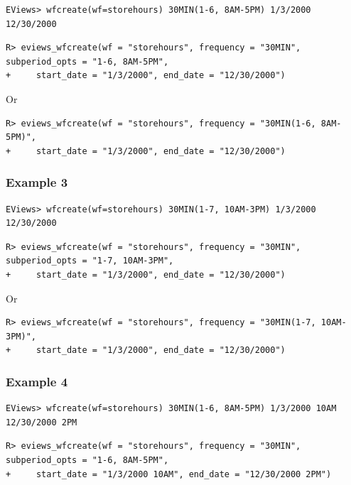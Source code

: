 \begin{verbatim}
EViews> wfcreate(wf=storehours) 30MIN(1-6, 8AM-5PM) 1/3/2000 12/30/2000
\end{verbatim}

\begin{verbatim}
R> eviews_wfcreate(wf = "storehours", frequency = "30MIN", subperiod_opts = "1-6, 8AM-5PM",
+     start_date = "1/3/2000", end_date = "12/30/2000")
\end{verbatim}

Or

\begin{verbatim}
R> eviews_wfcreate(wf = "storehours", frequency = "30MIN(1-6, 8AM-5PM)",
+     start_date = "1/3/2000", end_date = "12/30/2000")
\end{verbatim}

\hypertarget{example-3-2}{%
\subsubsection{Example 3}\label{example-3-2}}

\begin{verbatim}
EViews> wfcreate(wf=storehours) 30MIN(1-7, 10AM-3PM) 1/3/2000 12/30/2000
\end{verbatim}

\begin{verbatim}
R> eviews_wfcreate(wf = "storehours", frequency = "30MIN", subperiod_opts = "1-7, 10AM-3PM",
+     start_date = "1/3/2000", end_date = "12/30/2000")
\end{verbatim}

Or

\begin{verbatim}
R> eviews_wfcreate(wf = "storehours", frequency = "30MIN(1-7, 10AM-3PM)",
+     start_date = "1/3/2000", end_date = "12/30/2000")
\end{verbatim}

\hypertarget{example-4-2}{%
\subsubsection{Example 4}\label{example-4-2}}

\begin{verbatim}
EViews> wfcreate(wf=storehours) 30MIN(1-6, 8AM-5PM) 1/3/2000 10AM 12/30/2000 2PM
\end{verbatim}

\begin{verbatim}
R> eviews_wfcreate(wf = "storehours", frequency = "30MIN", subperiod_opts = "1-6, 8AM-5PM",
+     start_date = "1/3/2000 10AM", end_date = "12/30/2000 2PM")
\end{verbatim}

